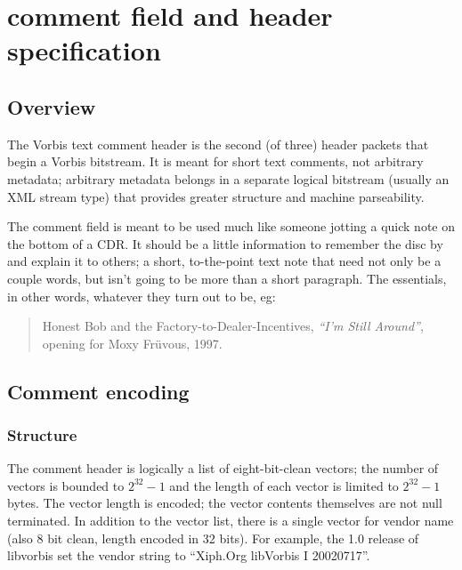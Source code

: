 \section{comment field and header specification} \label{vorbis:spec:comment}

\subsection{Overview}

The Vorbis text comment header is the second (of three) header
packets that begin a Vorbis bitstream. It is meant for short text
comments, not arbitrary metadata; arbitrary metadata belongs in a
separate logical bitstream (usually an XML stream type) that provides
greater structure and machine parseability.

The comment field is meant to be used much like someone jotting a
quick note on the bottom of a CDR. It should be a little information to
remember the disc by and explain it to others; a short, to-the-point
text note that need not only be a couple words, but isn't going to be
more than a short paragraph.  The essentials, in other words, whatever
they turn out to be, eg:

\begin{quote}
Honest Bob and the Factory-to-Dealer-Incentives, \textit{``I'm Still
Around''}, opening for Moxy Fr\"{u}vous, 1997.
\end{quote}




\subsection{Comment encoding}

\subsubsection{Structure}

The comment header is logically a list of eight-bit-clean vectors; the
number of vectors is bounded to $2^{32}-1$ and the length of each vector
is limited to $2^{32}-1$ bytes. The vector length is encoded; the vector
contents themselves are not null terminated. In addition to the vector
list, there is a single vector for vendor name (also 8 bit clean,
length encoded in 32 bits). For example, the 1.0 release of libvorbis
set the vendor string to ``Xiph.Org libVorbis I 20020717''.

